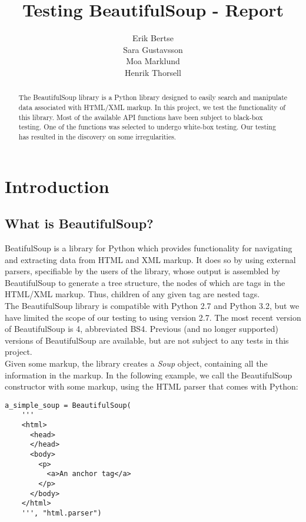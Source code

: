 \documentclass[10pt]{article}
\title{Testing BeautifulSoup - Report}
\author{Erik Bertse \\ Sara Gustavsson \\ Moa Marklund \\ Henrik Thorsell}
\date{}
\begin{document}
\maketitle

\begin{abstract}
  The BeautifulSoup library is a Python library designed to easily search and manipulate data associated with HTML/XML markup. In this project, we test the functionality of this library. Most of the available API functions have been subject to black-box testing. One of the functions was selected to undergo white-box testing. Our testing has resulted in the discovery on some irregularities.
\end{abstract}

\section{Introduction}

\subsection{What is BeautifulSoup?}
 BeatifulSoup is a library for Python which provides functionality for navigating and extracting data from HTML and XML markup. It does so by using external parsers, specifiable by the users of the library, whose output is assembled by BeautifulSoup to generate a tree structure, the nodes of which are tags in the HTML/XML markup. Thus, children of any given tag are nested tags. \\

 The BeautifulSoup library is compatible with Python 2.7 and Python 3.2, but we have limited the scope of our testing to using version 2.7. The most recent version of BeautifulSoup is 4, abbreviated BS4. Previous (and no longer supported) versions of BeautifulSoup are available, but are not subject to any tests in this project.  \\

Given some markup, the library creates a \textit{Soup} object, containing all the information in the markup. In the following example, we call the BeautifulSoup constructor with some markup, using the HTML parser that comes with Python: 
\newpage

\begin{lstlisting}[style = pythonstyle]
a_simple_soup = BeautifulSoup(
    '''
    <html>
      <head>
      </head>
      <body>
        <p>
          <a>An anchor tag</a>
        </p>
      </body>
    </html>
    ''', "html.parser")
\end{lstlisting}
\end{document}
